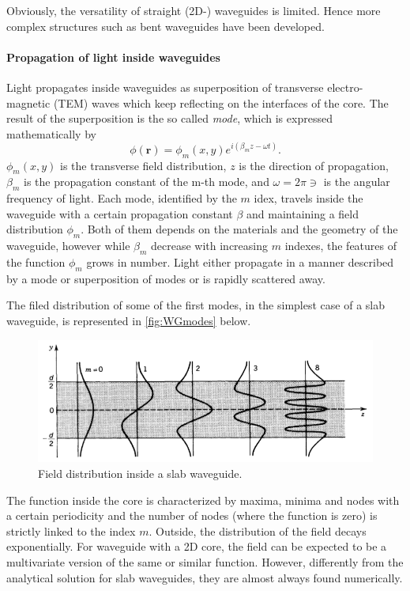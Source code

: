 Obviously, the versatility of straight (2D-) waveguides is limited.
Hence more complex structures such as bent waveguides have been developed.

\paragraph{Propagation of light inside waveguides\\}
\noindent Light propagates inside waveguides as superposition of transverse electro-magnetic (TEM) waves which keep reflecting on the interfaces of the core.
The result of the superposition is the so called \textit{mode}, which is expressed mathematically by
\begin{equation}
	\phi(\textbf{r}) = \phi_m\left( x, y \right) e^{i\left( \beta_m z - \omega t\right)}.
\end{equation}
$\phi_m\left( x, y \right)$ is the transverse field distribution, $z$ is the direction of propagation, $\beta_m$ is the propagation constant of the m-th mode, and $\omega=2\pi \ni$ is the angular frequency of light.
Each mode, identified by the $m$ idex, travels inside the waveguide with a certain propagation constant $\beta$ and maintaining a field distribution $\phi_m$.
Both of them depends on the materials and the geometry of the waveguide, however while $\beta_m$ decrease with increasing $m$ indexes, the features of the function $\phi_m$ grows in number.
Light either propagate in a manner described by a mode or superposition of modes or is rapidly scattered away.

The filed distribution of some of the first modes, in the simplest case of a slab waveguide, is represented in \autoref{fig:WGmodes} below.
\begin{figure}[ht]
	\centering
	\includegraphics[scale=0.8]{figures/modes.png}
	\caption{Field distribution inside a slab waveguide.}
	\label{fig:WGmodes}
\end{figure}
The function inside the core is characterized by maxima, minima and nodes with a certain periodicity and the number of nodes (where the function is zero) is strictly linked to the index $m$.
Outside, the distribution of the field decays exponentially.
For waveguide with a 2D core, the field can be expected to be a multivariate version of the same or similar function.
However, differently from the analytical solution for slab waveguides, they are almost always found numerically.

